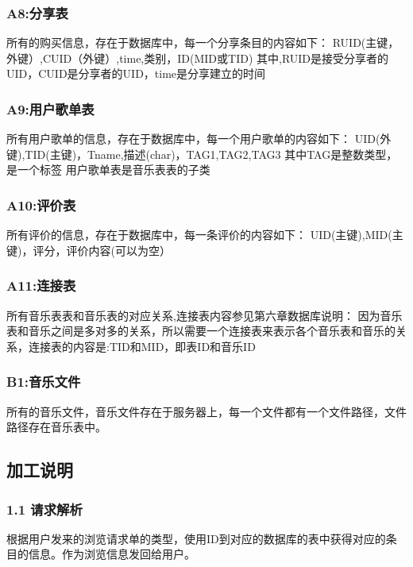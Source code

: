 \subsubsection{A8:分享表}

所有的购买信息，存在于数据库中，每一个分享条目的内容如下：
RUID(主键，外键）,CUID（外键）,time,类别，ID(MID或TID)
其中,RUID是接受分享者的UID，CUID是分享者的UID，time是分享建立的时间

\subsubsection{A9:用户歌单表}

所有用户歌单的信息，存在于数据库中，每一个用户歌单的内容如下：
UID(外键),TID(主键)，Tname,描述(char)，TAG1,TAG2,TAG3
其中TAG是整数类型，是一个标签
用户歌单表是音乐表表的子类


\subsubsection{A10:评价表}

所有评价的信息，存在于数据库中，每一条评价的内容如下：
UID(主键),MID(主键)，评分，评价内容(可以为空）

\subsubsection{A11:连接表}

所有音乐表表和音乐表的对应关系,连接表内容参见第六章数据库说明：
因为音乐表和音乐之间是多对多的关系，所以需要一个连接表来表示各个音乐表和音乐的关系，连接表的内容是:TID和MID，即表ID和音乐ID


\subsubsection{B1:音乐文件}

所有的音乐文件，音乐文件存在于服务器上，每一个文件都有一个文件路径，文件路径存在音乐表中。

\subsection{加工说明}
\subsubsection{1.1 请求解析}

根据用户发来的浏览请求单的类型，使用ID到对应的数据库的表中获得对应的条目的信息。作为浏览信息发回给用户。

